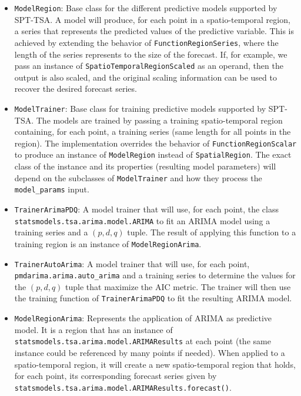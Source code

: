 \begin{itemize}
	\item \texttt{ModelRegion}: Base class for the different predictive models supported by SPT-TSA. A model will produce, for each point in a spatio-temporal region, a series that represents the predicted values of the predictive variable. This is achieved by extending the behavior of \texttt{FunctionRegionSeries}, where the length of the series represents to the size of the forecast. If, for example, we pass an instance of \texttt{SpatioTemporalRegionScaled} as an operand, then the output is also scaled, and the  original scaling information can be used to recover the desired forecast series.
	
	\item \texttt{ModelTrainer}: Base class for training predictive models supported by SPT-TSA. The models are trained by passing a training spatio-temporal region containing, for each point, a training series (same length for all points in the region). The implementation overrides the behavior of \texttt{FunctionRegionScalar} to produce an instance of \texttt{ModelRegion} instead of \texttt{SpatialRegion}. The exact class of the instance and its properties (resulting model parameters) will depend on the subclasses of \texttt{ModelTrainer} and how they process the \texttt{model\_params} input.
	
	\item \texttt{TrainerArimaPDQ}: A model trainer that will use, for each point, the class \\ \texttt{statsmodels.tsa.arima.model.ARIMA} to fit an ARIMA model using a training series and a $(p, d, q)$ tuple. The result of applying this function to a training region is an instance of \texttt{ModelRegionArima}.
	
	\item \texttt{TrainerAutoArima}: A model trainer that will use, for each point, \\
	\texttt{pmdarima.arima.auto\_arima} and a training series to determine the values for the $(p, d, q)$ tuple that maximize the AIC metric. The trainer will then use the training function of \texttt{TrainerArimaPDQ} to fit the resulting ARIMA model.
	
	\item \texttt{ModelRegionArima}: Represents the application of ARIMA as predictive model. It is a region that has an instance of \texttt{statsmodels.tsa.arima.model.ARIMAResults} at each point (the same instance could be referenced by many points if needed). When applied to a spatio-temporal region, it will create a new spatio-temporal region that holds, for each point, its corresponding forecast series given by \\
	\texttt{statsmodels.tsa.arima.model.ARIMAResults.forecast()}.
	

\end{itemize}
